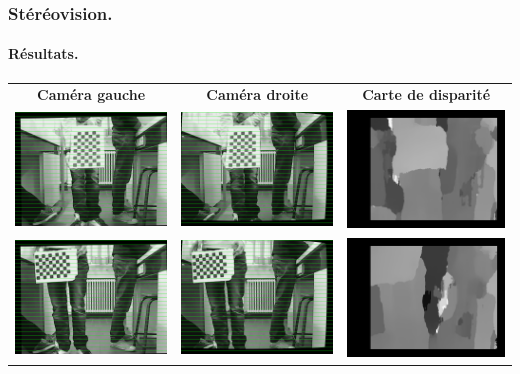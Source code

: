 \begin{frame}
    \frametitle{Stéréovision.}
    \framesubtitle{Résultats.}
    \begin{tabular}{ccc}
        \textbf{Caméra gauche} & \textbf{Caméra droite} & \textbf{Carte de disparité} \\
        \includegraphics[width=0.3\linewidth]{rcs/rem0l.png} & \includegraphics[width=0.3\linewidth]{rcs/rem0r.png} & \includegraphics[width=0.3\linewidth]{rcs/disp0.png} \\
        \includegraphics[width=0.3\linewidth]{rcs/rem1l.png} & \includegraphics[width=0.3\linewidth]{rcs/rem1r.png} & \includegraphics[width=0.3\linewidth]{rcs/disp1.png} \\

\end{tabular}
\end{frame}
